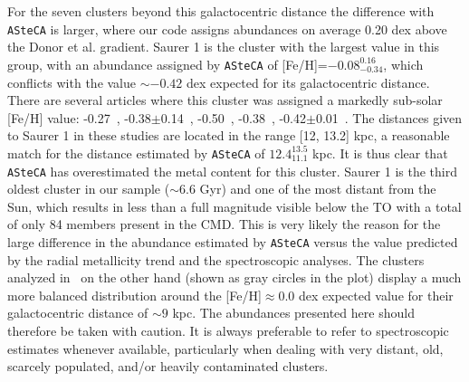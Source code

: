 \documentclass{aa}
\begin{document}
  For the seven clusters beyond this galactocentric distance the
  difference with \texttt{ASteCA} is larger, where our code assigns abundances
  on average 0.20 dex above the Donor et al. gradient.
  Saurer 1 is the cluster with the largest value in this group, with
  an abundance assigned by \texttt{ASteCA} of [Fe/H]=$-0.08_{-0.34}^{0.16}$,
  which conflicts with the value $\sim-0.42$ dex expected for its
  galactocentric distance.
  There are several articles where this cluster was assigned a 
  markedly sub-solar [Fe/H] value: -0.27~\citep{Carraro_2003},
  -0.38$\pm$0.14~\citep{Carraro_2004},
  -0.50~\citep{Frinchaboy_2004b}, -0.38~\citep{Frinchaboy_2006},
  -0.42$\pm$0.01~\citep{Donor_2020}. The distances given to Saurer 1 in these
  studies are located in the range [12, 13.2] kpc, a reasonable match
  for the distance estimated by \texttt{ASteCA} of $12.4_{11.1}^{13.5}$ kpc. It
  is thus clear that \texttt{ASteCA} has overestimated the metal
  content for this cluster. Saurer 1 is the third oldest cluster in our sample 
  ($\sim6.6$ Gyr) and one of the most distant from the Sun, which results in
  less than a  full magnitude visible below the TO with a total of only 84
  members present in the CMD. This is very likely the reason
  for the large difference in the abundance estimated by \texttt{ASteCA}
  versus the value predicted by the radial metallicity trend and the
  spectroscopic analyses.
  The clusters analyzed in~\cite{Perren_2020} on the other hand (shown as gray
  circles in the plot) display a much more balanced distribution around the 
  [Fe/H]$\approx0.0$ dex expected value for their galactocentric distance of
  $\sim9$ kpc.
  The abundances presented here should therefore be taken with
  caution. It is always preferable to refer to spectroscopic estimates
  whenever available, particularly when dealing with very distant, old,
  scarcely populated, and/or heavily contaminated clusters.\\
\end{document}
